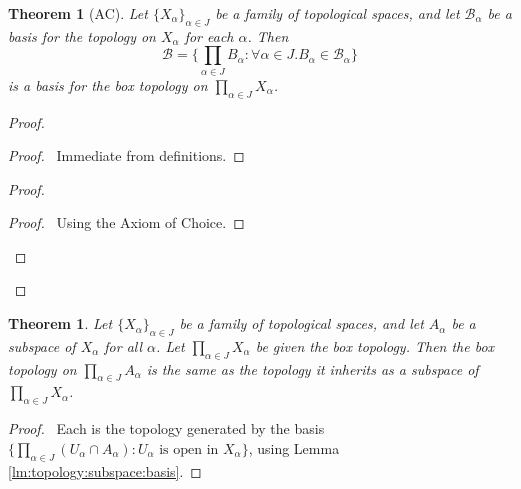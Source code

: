 \documentclass{report}
\let\qed\relax
\newtheorem{thm}[lm]{Theorem}
\theoremstyle{definition}
\begin{document}
  \begin{thm}[AC]
    Let $\{X_\alpha\}_{\alpha \in J}$ be a family of topological spaces, and
    let $\mathcal{B}_\alpha$ be a basis for the topology on $X_\alpha$ for each
    $\alpha$. Then
    \[ \mathcal{B} = \{ \prod_{\alpha \in J} B_\alpha : \forall \alpha \in J.
    B_\alpha \in \mathcal{B}_\alpha \} \]
    is a basis for the box topology on $\prod_{\alpha \in J} X_\alpha$.
  \end{thm}

  \begin{proof}
    \pf
    \begin{proof}
      \pf\ Immediate from definitions.
    \end{proof}
    \begin{proof}
      \begin{proof}
        \pf\ Using the Axiom of Choice.
      \end{proof}
    \end{proof}
    \qed
  \end{proof}

  \begin{thm}
    Let $\{X_\alpha\}_{\alpha \in J}$ be a family of topological spaces, and
    let $A_\alpha$ be a subspace of $X_\alpha$ for all $\alpha$. Let
    $\prod_{\alpha \in J} X_\alpha$ be given the box topology. Then the box
    topology on $\prod_{\alpha \in J} A_\alpha$ is the same as the topology it
    inherits as a subspace of $\prod_{\alpha \in J} X_\alpha$.
  \end{thm}

  \begin{proof}
    \pf\ Each is the topology generated by the basis \\$\{ \prod_{\alpha \in J}
    (U_\alpha \cap A_\alpha) : U_\alpha \text{ is open in } X_\alpha \}$, using
    Lemma \ref{lm:topology:subspace:basis}. \qed
  \end{proof}
\end{document}
